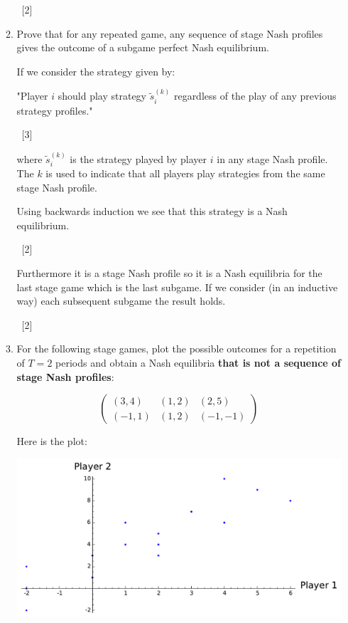 \documentclass[12pt,a4paper]{article}
\begin{document}
\begin{enumerate}
\begin{enumerate}
        ~\hfill[2]

        \item Prove that for any repeated game, any sequence of stage Nash profiles
            gives the outcome of a subgame perfect Nash equilibrium.

            If we consider the strategy given by:

            "Player \(i\) should play strategy \(\tilde s^{(k)}_i\) regardless of the play
            of any previous strategy profiles."

        ~\hfill[3]

            where \(\tilde s^{(k)}_i\) is the strategy played by player \(i\) in any stage
            Nash profile. The \(k\) is used to indicate that all players play strategies
            from the same stage Nash profile.

            Using backwards induction we see that this strategy is a Nash equilibrium.

        ~\hfill[2]

            Furthermore it is a stage Nash profile so it is a Nash equilibria for the last
            stage game which is the last subgame. If we consider (in an inductive way) each
            subsequent subgame the result holds.

        ~\hfill[2]

        \item For the following stage games, plot the possible outcomes for a
            repetition of \(T=2\) periods and obtain a Nash equilibria
            \textbf{that is not a sequence of stage Nash profiles}:

            \[
                \begin{pmatrix}
                    (3,4) & (1,2) & (2,5)\\
                    (-1,1) & (1,2) & (-1,-1)
                \end{pmatrix}
            \]

            Here is the plot:

            \begin{center}
                \includegraphics[width=.6\textwidth]{plots/resit-sol-2013-2014-plt01.pdf}
            \end{center}


\end{enumerate}
\end{enumerate}
\end{document}
